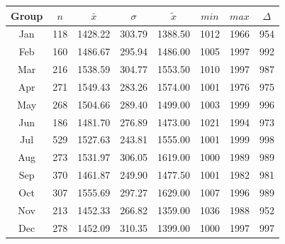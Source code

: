 \begin{figure}[ht!]
	\centering
	\begin{minipage}{0.5\textwidth}
		\tiny
		\setlength{\tabcolsep}{4pt}
		\centering
		\begin{tabular}{c|c|c|c|c|c|c|c}
			\toprule
			Group & $n$ & $\bar{x}$ & $\sigma$ & $\tilde{x}$ & $min$ & $max$ & $\Delta$ \\
			\midrule
			Jan & 118 & 1428.22 & 303.79 & 1388.50 & 1012 & 1966 & 954 \\ 
			Feb & 160 & 1486.67 & 295.94 & 1486.00 & 1005 & 1997 & 992 \\
			Mar & 216 & 1538.59 & 304.77 & 1553.50 & 1010 & 1997 & 987 \\
			Apr & 271 & 1549.43 & 283.26 & 1574.00 & 1001 & 1976 & 975 \\
			May & 268 & 1504.66 & 289.40 & 1499.00 & 1003 & 1999 & 996 \\
			Jun & 186 & 1481.70 & 276.89 & 1473.00 & 1021 & 1994 & 973 \\ 
			Jul & 529 & 1527.63 & 243.81 & 1555.00 & 1001 & 1999 & 998 \\
			Aug & 273 & 1531.97 & 306.05 & 1619.00 & 1000 & 1989 & 989 \\
			Sep & 370 & 1461.87 & 249.90 & 1477.50 & 1001 & 1982 & 981 \\ 
			Oct & 307 & 1555.69 & 297.27 & 1629.00 & 1007 & 1996 & 989 \\
			Nov & 213 & 1452.33 & 266.82 & 1359.00 & 1036 & 1988 & 952 \\ 
			Dec & 278 & 1452.09 & 310.35 & 1399.00 & 1000 & 1997 & 997 \\ 
			\bottomrule
		\end{tabular}
		\label{tbl:descriptives_arbis_matched_Month_TLCar}
	\end{minipage}%
	\begin{minipage}{0.55\textwidth}
\end{minipage}
\end{figure}
